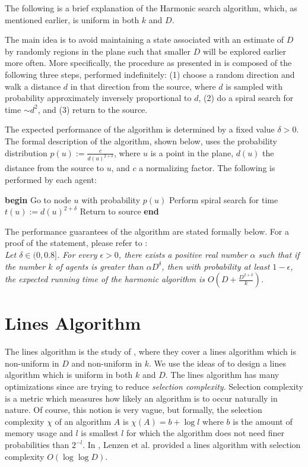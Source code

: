 \documentclass[runningheads,a4paper]{llncs}
\begin{document}
The following is a brief explanation of the Harmonic search algorithm, which, as mentioned earlier, is uniform in both $k$ and $D$.

The main idea is to avoid maintaining a state associated with an estimate of $D$ by randomly regions in the plane such that smaller $D$ will be explored earlier more often. More specifically, the procedure as presented in \cite{feinerman2012collaborative} is composed of the following three steps, performed indefinitely: (1) choose a random direction and walk a distance $d$ in that direction from the source, where $d$ is sampled with probability approximately inversely proportional to $d$, (2) do a spiral search for time $\sim d^2$, and (3) return to the source.

The expected performance of the algorithm is determined by a fixed value $\delta > 0$. The formal description of the algorithm, shown below, uses the probability distribution $p(u) := \frac{c}{d(u)^{2+\delta}}$, where $u$ is a point in the plane, $d(u)$ the distance from the source to $u$, and $c$ a normalizing factor. The following is performed by each agent:

\begin{codebox}
\li \textbf{begin}
\Then 
\li Go to node $u$ with probability $p(u)$
\li Perform spiral search for time $t(u) := d(u)^{2+\delta}$
\li Return to source 
\End
\li \textbf{end} 
\end{codebox}

The performance guarantees of the algorithm are stated formally below. For a proof of the statement, please refer to \cite{feinerman2012collaborative}: \\

\emph{
Let $\delta \in (0,0.8]$. For every $\epsilon > 0$, there exists a positive real number $\alpha$ such that if the number $k$ of agents is greater than $\alpha D^{\delta}$, then with probability at least $1-\epsilon$, the expected running time of the harmonic algorithm is $O( D + \frac{D^{2+\delta}}{k})$.
}

\section{Lines Algorithm}
\label{lines}

The lines algorithm is the study of \cite{lenzen2014trade}, where they cover a lines algorithm which is non-uniform in $D$ and non-uniform in $k$. We use the ideas of \cite{feinerman2012collaborative} to design a lines algorithm which is uniform in both $k$ and $D$. The lines algorithm has many optimizations since \cite{lenzen2014trade} are trying to reduce \emph{selection complexity}. Selection complexity is a metric which measures how likely an algorithm is to occur naturally in nature. Of course, this notion is very vague, but formally, the selection complexity $\chi$ of an algorithm $A$ is $\chi(A) = b + \log l$ where $b$ is the amount of memory usage and $l$ is smallest $l$ for which the algorithm does not need finer probabilities than $2^{-l}$. In \cite{lenzen2014trade}, Lenzen et al. provided a lines algorithm with selection complexity $O(\log \log D)$.
\end{document}
